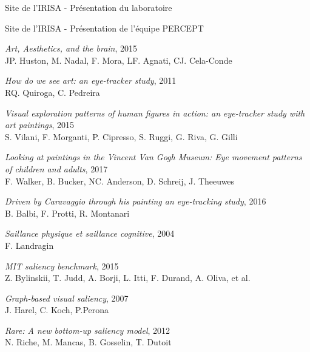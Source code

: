 
\begin{thebibliography}{99}

	  Site de l'IRISA - Présentation du laboratoire\\
      
	  Site de l'IRISA - Présentation de l'équipe PERCEPT\\

    \emph{Art, Aesthetics, and the brain}, 2015\\
    JP. Huston, M. Nadal, F. Mora, LF. Agnati, CJ. Cela-Conde
  
    \emph{How do we see art: an eye-tracker study}, 2011\\
    RQ. Quiroga, C. Pedreira

    \emph{Visual exploration patterns of human figures in action: an eye-tracker study with art paintings}, 2015\\
    S. Vilani, F. Morganti, P. Cipresso, S. Ruggi, G. Riva, G. Gilli

    \emph{Looking at paintings in the Vincent Van Gogh Museum: Eye movement patterns of children and adults}, 2017\\
    F. Walker, B. Bucker, NC. Anderson, D. Schreij, J. Theeuwes

    \emph{Driven by Caravaggio through his painting an eye-tracking study}, 2016\\
    B. Balbi, F. Protti, R. Montanari

    \emph{Saillance physique et saillance cognitive}, 2004\\
    F. Landragin\\

    \emph{MIT saliency benchmark}, 2015\\
    Z. Bylinskii, T. Judd, A. Borji, L. Itti, F. Durand, A. Oliva, et al.\\

    \emph{Graph-based visual saliency}, 2007\\
    J. Harel, C. Koch, P.Perona

    \emph{Rare: A new bottom-up saliency model}, 2012\\
    N. Riche, M. Mancas, B. Gosselin, T. Dutoit


\end{thebibliography}
